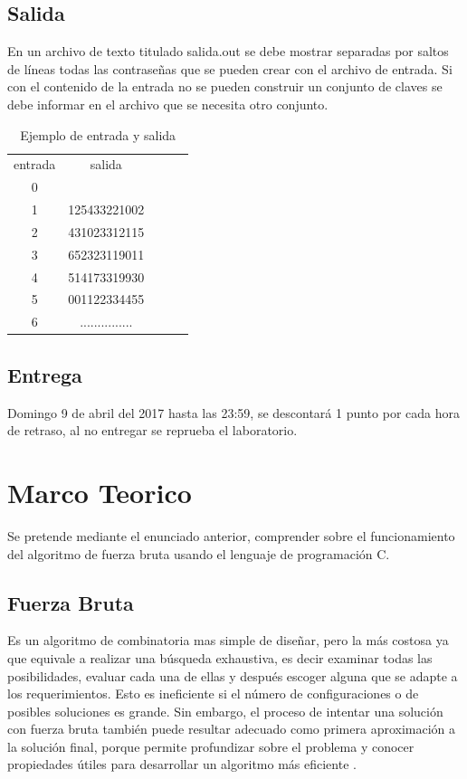 \documentclass[9pt,twocolumn,twoside]{optica}
\begin{document}
\subsection{Salida}
En un archivo de texto titulado
salida.out
se debe mostrar separadas por
saltos de líneas todas las contraseñas que se pueden crear con el archivo de
entrada. Si con el contenido de la entrada no se pueden construir un conjunto
de claves se debe informar en el archivo que se necesita otro conjunto.



\begin{table}
\centering
\caption{Ejemplo de entrada y salida }
\label{my-label}
\begin{tabular}{|c|c|lll}
\cline{1-2}
entrada & salida &  &  &  \\ \cline{1-2}
0         &          &  &  &  \\ \cline{1-2}
1         & 125433221002         &  &  &  \\ \cline{1-2}
2         & 431023312115         &  &  &  \\ \cline{1-2}
3         & 652323119011         &  &  &  \\ \cline{1-2}
4         & 514173319930         &  &  &  \\ \cline{1-2}
5         & 001122334455         &  &  &  \\ \cline{1-2}
6         & ...............         &  &  &  \\ \cline{1-2}
\end{tabular}
\end{table}

\subsection{Entrega}
Domingo 9 de abril del 2017 hasta las 23:59, se descontará 1 punto
por cada hora de retraso, al no entregar se reprueba el laboratorio.


\section{Marco Teorico}
Se pretende mediante el enunciado anterior, comprender sobre el funcionamiento del algoritmo de fuerza bruta usando el lenguaje de programación C.

\subsection{Fuerza Bruta}
Es un algoritmo de combinatoria mas simple de diseñar, pero la más costosa ya que equivale a realizar una búsqueda exhaustiva, es decir examinar todas las posibilidades, evaluar cada una de ellas y después escoger alguna que se adapte a los requerimientos. Esto es ineficiente si el número de configuraciones o de posibles soluciones es grande. 
Sin embargo, el proceso de intentar una solución con fuerza bruta también puede resultar adecuado como primera aproximación a la solución final, porque permite profundizar sobre el problema y conocer propiedades útiles para desarrollar un algoritmo más eficiente \cite{algoritmo}.
\end{document}
